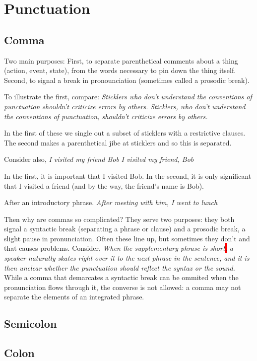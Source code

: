 \documentclass{article}
\newcommand{\hlq}[1]{\colorbox{red}{#1}}
\newcommand{\example}[1]{\textit{#1}}
\begin{document}
\section{Punctuation}

\subsection{Comma}

Two main purposes:
First, to separate parenthetical comments about a thing (action, event, state), from the words necessary to pin down the thing itself. Second, to signal a break in pronounciation (sometimes called a prosodic break).


To illustrate the first, compare:
\example{Sticklers who don't understand the conventions of punctuation shouldn't criticize errors by others.}
\example{Sticklers, who don't understand the conventions of punctuation, shouldn't criticize errors by others.}

In the first of these we single out a subset of sticklers with a restrictive clauses. The second makes a parenthetical jibe at sticklers and so this is separated.

Consider also,
\example{I visited my friend Bob}
\example{I visited my friend, Bob}

In the first, it is important that I visited Bob. In the second, it is only significant that I visited a friend (and by the way, the friend's name is Bob).

After an introductory phrase.
\example{After meeting with him, I went to lunch}



Then why are commas so complicated? They serve two purposes: they both signal a syntactic break (separating a phrase or clause) and a prosodic break, a slight pause in pronunciation.
Often these line up, but sometimes they don't and that causes problems. Consider,
\example{When the supplementary phrase is short\hlq{,} a speaker naturally skates right over it to the next phrase in the sentence, and it is then unclear whether the punctuation should reflect the syntax or the sound.}
While a comma that demarcates a syntactic break can be ommited when the pronunciation flows through it, the converse is not allowed: a comma may not separate the elements of an integrated phrase.

\subsection{Semicolon}

\subsection{Colon}
\end{document}
